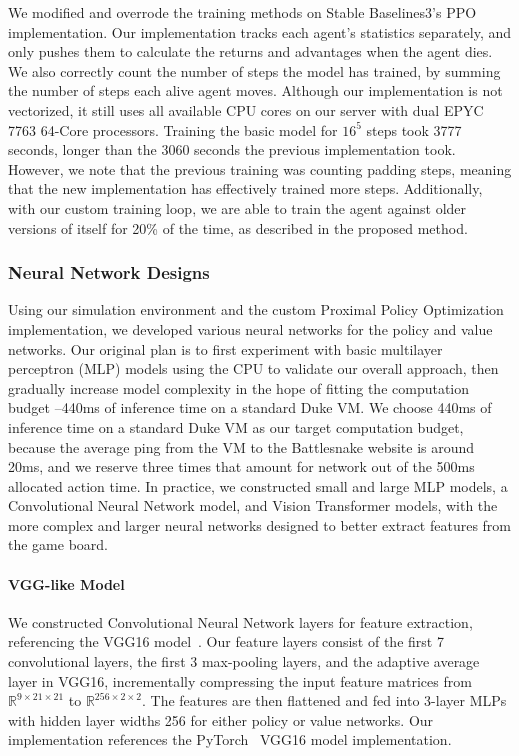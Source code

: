 \documentclass[conference]{IEEEtran}
\begin{document}
We modified and overrode the training methods on Stable Baselines3's PPO
implementation. Our implementation tracks each agent's statistics separately,
and only pushes them to calculate the returns and advantages when the agent
dies. We also correctly count the number of steps the model has trained,
by summing the number of steps each alive agent moves.
Although our implementation is not vectorized,
it still uses all available CPU cores on our server with dual EPYC 7763 64-Core
processors. Training the basic model for $16^5$ steps took 3777 seconds,
longer than the 3060 seconds the previous implementation took. However,
we note that the previous training was counting padding steps,
meaning that the new implementation has effectively trained more steps.
Additionally, with our custom training loop,
we are able to train the agent against older versions of itself for 20\% of the
time, as described in the proposed method.

\subsubsection{Neural Network Designs}

Using our simulation environment and the custom Proximal Policy Optimization implementation,
we developed various neural networks for the policy and value networks.
Our original plan is to first experiment with basic multilayer perceptron (MLP)
models using the CPU to validate our overall approach,
then gradually increase model complexity in the hope of fitting the computation
budget
--440ms of inference time on a standard Duke VM.
We choose 440ms of inference time on a standard Duke VM as our target computation budget, because the average ping from the VM to the
Battlesnake website is around 20ms,
and we reserve three times that amount for network out of the 500ms allocated
action time.
In practice, we constructed small and large MLP models, a Convolutional Neural
Network model, and Vision Transformer models,
with the more complex and larger neural networks designed to better extract
features from the game board.

\paragraph{VGG-like Model}
We constructed Convolutional Neural Network layers for feature extraction,
referencing the VGG16 model~\cite{simonyan2014very}.
Our feature layers consist of the first 7 convolutional layers,
the first 3 max-pooling layers, and the adaptive average layer in VGG16,
incrementally compressing the input feature matrices from $\mathbb R^{9\times
            21\times 21}$ to $\mathbb R^{256\times 2\times 2}$.
The features are then flattened and fed into 3-layer MLPs with hidden layer
widths 256 for either policy or value networks.
Our implementation references the PyTorch~\cite{paszke2019pytorch}
VGG16 model implementation.
\end{document}
